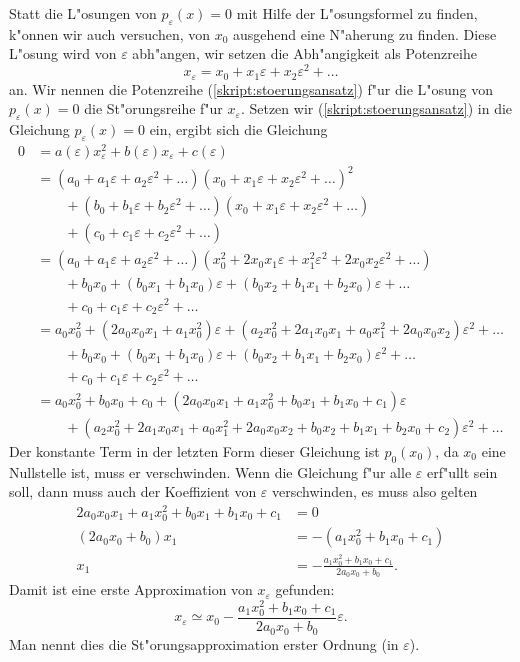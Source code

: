 Statt die L"osungen von $p_{\varepsilon}(x)=0$ mit Hilfe der L"osungsformel
zu finden, k"onnen wir auch versuchen, von $x_0$ ausgehend eine N"aherung
zu finden. Diese L"osung wird von $\varepsilon$ abh"angen, wir setzen
die Abh"angigkeit als Potenzreihe
\begin{equation}
x_\varepsilon = x_0 + x_1\varepsilon +x_2 \varepsilon^2+\dots
\label{skript:stoerungsansatz}
\end{equation}
an.
Wir nennen die Potenzreihe (\ref{skript:stoerungsansatz}) f"ur die L"osung
von $p_\varepsilon(x)=0$ die St"orungsreihe f"ur $x_\varepsilon$.
Setzen wir (\ref{skript:stoerungsansatz}) in die Gleichung $p_{\varepsilon}(x)=0$
ein, ergibt sich die Gleichung
\begin{align*}
0&=a(\varepsilon)x_\varepsilon^2+b(\varepsilon)x_\varepsilon+c(\varepsilon)
\\
&=
(a_0+a_1\varepsilon+a_2\varepsilon^2+\dots)
(x_0+x_1\varepsilon+x_2\varepsilon^2+\dots)^2\\
&\qquad
+
(b_0+b_1\varepsilon+b_2\varepsilon^2+\dots)
(x_0+x_1\varepsilon+x_2\varepsilon^2+\dots)\\
&\qquad
+
(c_0+c_1\varepsilon+c_2\varepsilon^2+\dots)
\\
&=
(a_0+a_1\varepsilon+a_2\varepsilon^2+\dots)
(x_0^2+2x_0x_1\varepsilon +x_1^2\varepsilon^2+2x_0x_2\varepsilon^2+\dots)
\\
&\qquad
+
b_0x_0 + (b_0x_1+b_1x_0)\varepsilon+(b_0x_2+b_1x_1+b_2x_0)\varepsilon+\dots\\
&\qquad
+
c_0+c_1\varepsilon+c_2\varepsilon^2+\dots
\\
&=
a_0x_0^2 + (2a_0x_0x_1 + a_1x_0^2)\varepsilon +
(a_2x_0^2 + 2a_1x_0x_1 + a_0x_1^2 +2a_0x_0x_2)\varepsilon^2+\dots
\\
&\qquad
+
b_0x_0 + (b_0x_1+b_1x_0)\varepsilon+(b_0x_2+b_1x_1+b_2x_0)\varepsilon^2+\dots\\
&\qquad
+
c_0+c_1\varepsilon+c_2\varepsilon^2+\dots
\\
&=
a_0x_0^2 + b_0x_0+c_0
+(2a_0x_0x_1+a_1x_0^2+b_0x_1+b_1x_0+c_1)\varepsilon
\\
&\qquad
+(
a_2x_0^2 + 2a_1x_0x_1 + a_0x_1^2 +2a_0x_0x_2
+b_0x_2+b_1x_1+b_2x_0
+c_2
)\varepsilon^2+\dots
\end{align*}
Der konstante Term in der letzten Form dieser Gleichung ist $p_0(x_0)$, 
da $x_0$ eine Nullstelle ist, muss er verschwinden. Wenn die Gleichung
f"ur alle $\varepsilon$ erf"ullt sein soll, dann muss auch der
Koeffizient von $\varepsilon$ verschwinden, es muss also gelten
\begin{align*}
2a_0x_0x_1+a_1x_0^2+b_0x_1+b_1x_0+c_1&= 0
\\
(2a_0x_0+b_0)x_1&=-(a_1x_0^2+b_1x_0+c_1)\\
x_1&=-
\frac{a_1x_0^2+b_1x_0+c_1}{2a_0x_0+b_0}.
\end{align*}
Damit ist eine erste Approximation von $x_\varepsilon$ gefunden:
\[
x_\varepsilon\simeq x_0 -
\frac{a_1x_0^2+b_1x_0+c_1}{2a_0x_0+b_0}\varepsilon.
\]
Man nennt dies die St"orungsapproximation erster Ordnung (in $\varepsilon$).

